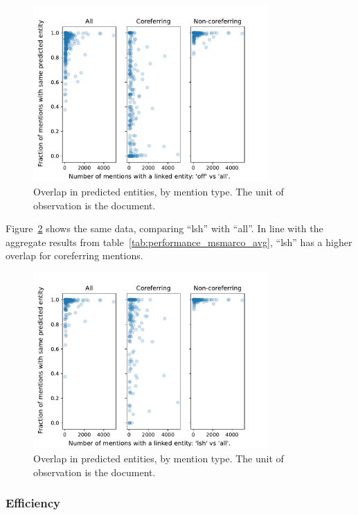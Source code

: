 \documentclass[a4paper,11pt]{article}
\numberwithin{equation}{section} %
\begin{document}
\begin{figure}[H]
  \centering
  \includegraphics[width = 0.8\textwidth]{../figs/msmarco_overlap_off.pdf}
  \caption{Overlap in predicted entities, by mention type. The unit of observation is the document.}
  \label{fig:msmarco_overlap_off}
\end{figure}


Figure~\ref{fig:msmarco_overlap_lsh} shows the same data, comparing ``lsh'' with ``all''. In line with the aggregate results from table~\ref{tab:performance_msmarco_avg}, ``lsh'' has a higher overlap for coreferring mentions.


\begin{figure}[H]
  \centering
  \includegraphics[width = 0.8\textwidth]{../figs/msmarco_overlap_lsh.pdf}
  \caption{Overlap in predicted entities, by mention type. The unit of observation is the document.}
  \label{fig:msmarco_overlap_lsh}
\end{figure}


\subsubsection{Efficiency}
\end{document}
